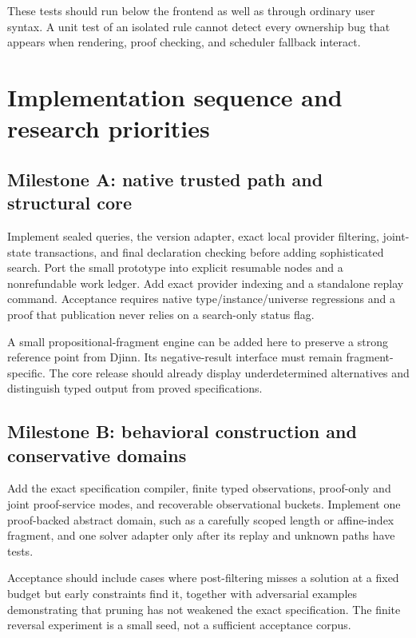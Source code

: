 \documentclass[11pt,letterpaper]{article}
\theoremstyle{definition}
\theoremstyle{remark}
\begin{document}
These tests should run below the frontend as well as through ordinary user syntax. A unit test of an isolated rule cannot detect every ownership bug that appears when rendering, proof checking, and scheduler fallback interact.

\section{Implementation sequence and research priorities}
\label{sec:roadmap}

\subsection{Milestone A: native trusted path and structural core}

Implement sealed queries, the version adapter, exact local provider filtering, joint-state transactions, and final declaration checking before adding sophisticated search. Port the small prototype into explicit resumable nodes and a nonrefundable work ledger. Add exact provider indexing and a standalone replay command. Acceptance requires native type/instance/universe regressions and a proof that publication never relies on a search-only status flag.

A small propositional-fragment engine can be added here to preserve a strong reference point from Djinn. Its negative-result interface must remain fragment-specific. The core release should already display underdetermined alternatives and distinguish typed output from proved specifications.

\subsection{Milestone B: behavioral construction and conservative domains}

Add the exact specification compiler, finite typed observations, proof-only and joint proof-service modes, and recoverable observational buckets. Implement one proof-backed abstract domain, such as a carefully scoped length or affine-index fragment, and one solver adapter only after its replay and unknown paths have tests.

Acceptance should include cases where post-filtering misses a solution at a fixed budget but early constraints find it, together with adversarial examples demonstrating that pruning has not weakened the exact specification. The finite reversal experiment is a small seed, not a sufficient acceptance corpus.
\end{document}
